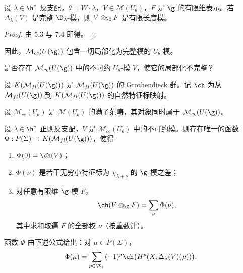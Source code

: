 \begin{proposition}\label{prop:03.7.5}
设 $\lambda\in\h^*$ 反支配，$\theta=W\cdot\lambda$，$V\in\mathcal{M}(U_\theta)$，$F$ 是 $\g$ 的有限维表示。若 $\Delta_\lambda(V)$ 是完整 $\D_\lambda$-模，则 $V\otimes_\C F$ 是有限长度模。
\end{proposition}

\begin{proof}
由 5.3 与 7.4 即得。
\end{proof}

因此，$\mathcal{M}_{cc}(U(\g))$ 包含一切局部化为完整模的 $U_\theta$-模。

\begin{remark}\label{rem:03.7.6}
是否存在 $\mathcal{M}_{cc}(U(\g))$ 中的不可约 $U_\theta$-模 $V$，使它的局部化不完整？
\end{remark}

设 $K(\mathcal{M}_{fl}(U(\g)))$ 是 $\mathcal{M}_{fl}(U(\g))$ 的 Grothendieck 群。记 $\ch$ 为从 $\mathcal{M}_{fl}(U(\g))$ 到 $K(\mathcal{M}_{fl}(U(\g)))$ 的自然特征标映射。

设 $\mathcal{M}_{cc}(U_\theta)$ 是 $\mathcal{M}(U_\theta)$ 的满子范畴，其对象同时属于 $\mathcal{M}_{cc}(U(\g))$。

\begin{theorem}\label{thm:03.7.7}
设 $\lambda\in\h^*$ 正则反支配，$V$ 是 $\mathcal{M}_{cc}(U_\theta)$ 中的不可约模。则存在唯一的函数 $\Phi:P(\Sigma)\to K(\mathcal{M}_{fl}(U(\g)))$，使得
\begin{enumerate}[label=(\roman*),leftmargin=2.6em,itemsep=0.1em]
\item $\Phi(0)=\ch(V)$；
\item $\Phi(\nu)$ 是若干无穷小特征标为 $\chi_{\lambda+\nu}$ 的 $\g$-模之差；
\item 对任意有限维 $\g$-模 $F$，
$$\ch(V\otimes_\C F)=\sum_{\nu}\Phi(\nu),$$
其中求和取遍 $F$ 的全部权 $\nu$（按重数计）。
\end{enumerate}
函数 $\Phi$ 由下述公式给出：对 $\mu\in P(\Sigma)$，
$$\Phi(\mu)=\sum_{p\in\Z_+}(-1)^p\ch\bigl(H^p(X,\Delta_\lambda(V)(\mu))\bigr).$$
\end{theorem}

